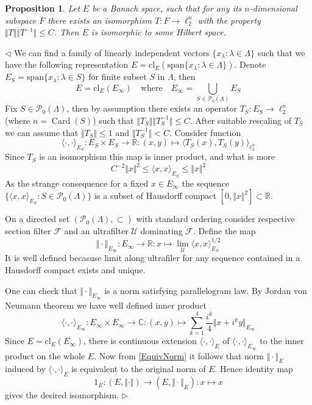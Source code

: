 \documentclass[12pt]{article}
\newtheorem{proposition}[theorem]{Proposition}
\newenvironment{proof}{\par $\triangleleft$}{$\triangleright$}
\begin{document}
\begin{proposition} Let $E$ be a Banach space, such that for any its $n$-dimensional subspace $F$ there exists an isomorphism 
$T:F\to \ell_2^n$ with the property $\Vert T\Vert\Vert T^{-1}\Vert\leq C$. Then $E$ is isomorphic to some Hilbert space.
\end{proposition}
\begin{proof}
We can find a family of linearly independent vectors $\{x_\lambda:\lambda\in\Lambda\}$  such that we have the following representation $E=\mathrm{cl}_E\left(\mathrm{span}\{x_\lambda:\lambda\in\Lambda\}\right)$. Denote $E_S=\mathrm{span}\{x_\lambda:\lambda\in S\}$ for finite subset $S$ in $\Lambda$, then
$$
E=\mathrm{cl}_E(E_\infty)\quad\text{where}\quad E_\infty=\bigcup\limits_{S\in\mathcal{P}_0(\Lambda)} E_S
$$ 
Fix $S\in\mathcal{P}_0(\Lambda)$, then by assumption there exists an operator $T_S:E_S\to\ell_2^n$ (where $n=\operatorname{Card}(S)$) such that $\Vert T_S\Vert\Vert T_S^{-1}\Vert\leq C$. After suitable rescaling of $T_S$ we can assume that $\Vert T_S\Vert\leq 1$ and $\Vert T_S^{-1}\Vert< C$. Consider function
$$
\langle\cdot, \cdot\rangle_{E_S}: E_S\times E_S\to\mathbb{R}:(x,y)\mapsto \langle T_S(x),T_S(y)\rangle_{\ell_2^n} 
$$
Since $T_S$ is an isomorphism this map is inner product, and what is more
\begin{equation}\label{EquivNorm}
C^{-2}\Vert x\Vert^2\leq \langle x, x\rangle_{E_S}\leq\Vert x\Vert^2
\end{equation}
As the strange consequence for a fixed $x\in E_\infty$ the sequence $\{\langle x, x\rangle_{E_S}:S\in\mathcal{P}_0(\Lambda)\}$ is a subset of Hausdorff compact $[0, \Vert x\Vert^2]\subset\mathbb{R}$.

On a directed set $(\mathcal{P}_0(\Lambda),\subset)$ with standard ordering consider respective section filter $\mathcal{F}$ and an ultrafilter $\mathcal{U}$ dominating $\mathcal{F}$. Define the map
$$
\Vert\cdot\Vert_{E_\infty} :E_\infty\to\mathbb{R}: x\mapsto\lim\limits_{\mathcal{U}}\langle x, x\rangle_{E_S}^{1/2}
$$
It is well defined becasuse limit along ultrafiler for any sequence contained in a Hausdorff compact exists and unique.

One can check that $\Vert\cdot\Vert_{E_\infty}$ is a norm satisfying parallelogram law. By Jordan von Neumann theorem we have well defined inner product
$$
\langle\cdot,\cdot\rangle_{E_\infty}:E_\infty\times E_\infty\to\mathbb{C}:(x,y)\mapsto\sum\limits_{k=1}^4\frac{i^k}{4}\Vert x+i^ky\Vert_{E_\infty} 
$$
Since $E=\mathrm{cl}_E(E_\infty)$, there is continuous extension $\langle\cdot,\cdot\rangle_E$ of $\langle\cdot,\cdot\rangle_{E_\infty}$ to the inner product on the whole $E$. Now from \ref{EquivNorm} it follows that norm $\Vert\cdot\Vert_E$ induced by $\langle\cdot,\cdot\rangle_E$ is equivalent to the original norm of $E$. Hence identity map
$$
1_E:(E,\Vert\cdot\Vert)\to(E,\Vert\cdot\Vert_E):x\mapsto x
$$
gives the desired isomorphism. 
\end{proof}
\end{document}
